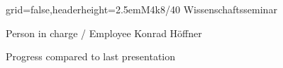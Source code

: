 \documentclass[english]{kiesgrube}
\begin{document}
\begin{poster}{grid=false,headerheight=2.5em}{}{M4k8/40 Wissenschaftsseminar}{}{}
\begin{posterbox}[name=person,column=0,row=0]{Person in charge / Employee}
Konrad Höffner
\end{posterbox}
\begin{posterbox}[name=progress,below=person,span=2]{Progress compared to last presentation}
\footnotesize
\begin{tabulary}{\textwidth}{lllllL}

\end{tabulary}
\end{posterbox}
\end{poster}
\end{document}
